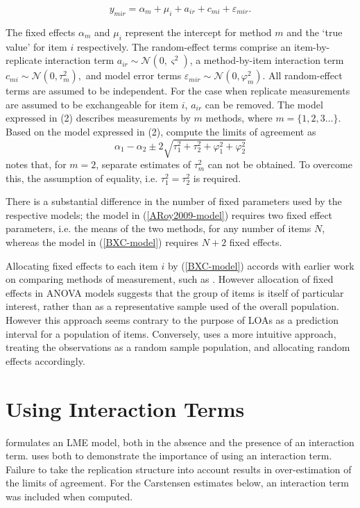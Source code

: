 \documentclass[12pt, a4paper]{report}
\theoremstyle{plain}
\theoremstyle{definition}
\theoremstyle{remark}
\begin{document}
	\begin{equation}\label{BXC-model}
	y_{mir}  = \alpha_{m} + \mu_{i} + a_{ir} + c_{mi} + \varepsilon_{mir}.
	\end{equation}
	
	The fixed effects $\alpha_{m}$ and $\mu_{i}$ represent the intercept for method $m$ and the `true value' for item $i$ respectively. The random-effect terms comprise an item-by-replicate interaction term $a_{ir} \sim \mathcal{N}(0,\varsigma^{2})$, a method-by-item interaction term $c_{mi} \sim \mathcal{N}(0,\tau^{2}_{m}),$ and model error terms $\varepsilon_{mir} \sim \mathcal{N}(0,\varphi^{2}_{m}).$ All random-effect terms are assumed to be independent. For the case when replicate measurements are assumed to be exchangeable for item $i$, $a_{ir}$ can be removed. The model expressed in (2) describes measurements by $m$ methods, where $m = \{1,2,3\ldots\}$. Based on the model expressed in (2), \citet{BXC2008} compute the limits of agreement as
	\[
	\alpha_1 - \alpha_2 \pm 2 \sqrt{ \tau^2_1 +  \tau^2_2 +  \varphi^2_1 +  \varphi^2_2 }
	\]
	\citet{BXC2008} notes that, for $m=2$,  separate estimates of $\tau^2_m$ can not be obtained. To overcome this, the assumption of equality, i.e. $\tau^2_1 = \tau^2_2$ is required.
	
	There is a substantial difference in the number of fixed parameters used by the respective models; the model in (\ref{ARoy2009-model}) requires two fixed effect parameters, i.e. the means of the two methods, for any number of items $N$, whereas the model in (\ref{BXC-model}) requires $N+2$ fixed effects.
	
	Allocating fixed effects to each item $i$ by (\ref{BXC-model}) accords with earlier work on comparing methods of measurement, such as \citet{Grubbs48}. However allocation of fixed effects in ANOVA models suggests that the group of items is itself of particular interest, rather than as a representative sample used of the overall population. However this approach seems contrary to the purpose of LOAs as a prediction interval for a population of items. Conversely, \citet{ARoy2009}
	uses a more intuitive approach, treating the observations as a random sample population, and allocating random effects accordingly.
	
	
	\section{Using Interaction Terms}
	\citet{BXC2008} formulates an LME model, both in the absence and the presence of an interaction term.\citet{BXC} uses both to demonstrate the importance of using an interaction term. Failure to take the replication structure into
	account results in over-estimation of the limits of agreement. For the Carstensen estimates below, an interaction term was included when computed.
	
\end{document}
